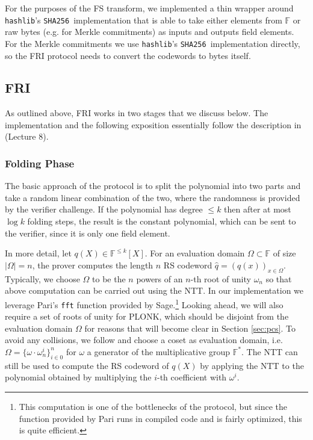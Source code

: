 \documentclass[final]{zamarep}
\newcommand{\field}{\mathbb{F}}
\newcommand{\sha}{\texttt{SHA256}~}
\newcommand{\abs}[1]{\lvert #1 \rvert}
\begin{document}
For the purposes of the FS transform, we implemented a thin wrapper around \verb+hashlib+'s \sha implementation that is able to take either elements from $\field$ or raw bytes (e.g. for Merkle commitments) as inputs and outputs field elements. For the Merkle commitments we use \verb+hashlib+'s \sha implementation directly, so the FRI protocol needs to convert the codewords to bytes itself.

\subsection{FRI}
\label{sec:fri_basic}
As outlined above, FRI works in two stages that we discuss below. The implementation and the following exposition essentially follow the description in \cite{zkp_mooc} (Lecture 8).

\subsubsection{Folding Phase}
\label{sec:fold}
The basic approach of the protocol is to split the polynomial into two parts and take a random linear combination of the two, where the randomness is provided by the verifier challenge. If the polynomial has degree $\leq k$ then after at most $\log k$ folding steps, the result is the constant polynomial, which can be sent to the verifier, since it is only one field element.


In more detail, let $q(X) \in \field^{\leq k}[X]$. For an evaluation domain $\Omega \subset \field$ of size $\abs{\Omega} = n$, the prover computes the length $n$ RS codeword $\hat q = (q(x))_{x \in \Omega}$. Typically, we choose $\Omega$ to be the $n$ powers of an $n$-th root of unity $\omega_n$ so that above computation can be carried out using the NTT. In our implementation we leverage Pari's \verb+fft+ function provided by Sage.\footnote{This computation is one of the bottlenecks of the protocol, but since the function provided by Pari runs in compiled code and is fairly optimized, this is quite efficient.} Looking ahead, we will also require a set of roots of unity for PLONK, which should be disjoint from the evaluation domain $\Omega$ for reasons that will become clear in Section \ref{sec:pcs}. To avoid any collisions, we follow \cite{EPRINT:StarkWare21} and choose a coset as evaluation domain, i.e.\ $\Omega = \{\omega \cdot \omega_n^i \}_{i \in 0}^n$ for $\omega$ a generator of the multiplicative group $\field^*$. The NTT can still be used to compute the RS codeword of $q(X)$ by applying the NTT to the polynomial obtained by multiplying the $i$-th coefficient with $\omega^i$.
\end{document}
